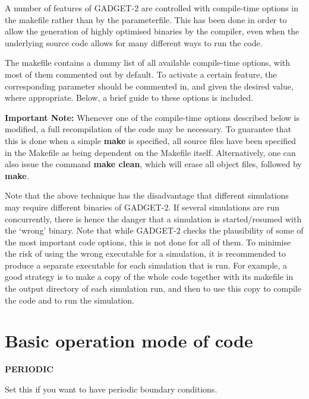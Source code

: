 A number of features of GADGET-\/2 are controlled with compile-\/time options in the makefile rather than by the parameterfile. This has been done in order to allow the generation of highly optimised binaries by the compiler, even when the underlying source code allows for many different ways to run the code.

The makefile contains a dummy list of all available compile-\/time options, with most of them commented out by default. To activate a certain feature, the corresponding parameter should be commented in, and given the desired value, where appropriate. Below, a brief guide to these options is included.

{\bfseries Important Note:} Whenever one of the compile-\/time options described below is modified, a full recompilation of the code may be necessary. To guarantee that this is done when a simple {\bfseries make} is specified, all source files have been specified in the Makefile as being dependent on the Makefile itself. Alternatively, one can also issue the command {\bfseries make clean}, which will erase all object files, followed by {\bfseries make}.

Note that the above technique has the disadvantage that different simulations may require different binaries of GADGET-\/2. If several simulations are run concurrently, there is hence the danger that a simulation is started/resumed with the `wrong' binary. Note that while GADGET-\/2 checks the plausibility of some of the most important code options, this is not done for all of them. To minimise the risk of using the wrong executable for a simulation, it is recommended to produce a separate executable for each simulation that is run. For example, a good strategy is to make a copy of the whole code together with its makefile in the output directory of each simulation run, and then to use this copy to compile the code and to run the simulation.

\par
 \hypertarget{Gadget-Makefile_secmake1}{}\section{Basic operation mode of code}\label{Gadget-Makefile_secmake1}

\begin{DoxyItemize}
\item {\bfseries PERIODIC} \par
 Set this if you want to have periodic boundary conditions.
\end{DoxyItemize}


